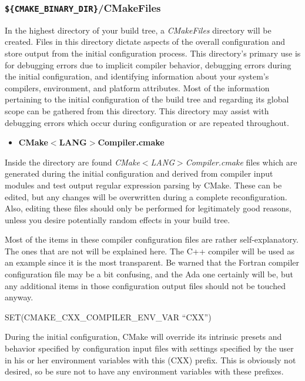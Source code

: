 \documentclass[12pt,letterpaper]{article}
\begin{document}
\subsubsection{\texttt{\$\{CMAKE\_BINARY\_DIR\}}/CMakeFiles}

In the highest directory of your build tree, a \emph{CMakeFiles} directory will be created.  Files in this directory dictate aspects of the overall configuration and store output from the initial configuration process.  This directory's primary use is for debugging errors due to implicit compiler behavior, debugging errors during the initial configuration, and identifying information about your system's compilers, environment, and platform attributes.  Most of the information pertaining to the initial configuration of the build tree and regarding its global scope can be gathered from this directory.  This directory may assist with debugging errors which occur during configuration or are repeated throughout.

\begin{itemize}
\item \textbf{CMake$<$LANG$>$Compiler.cmake}
\end{itemize}

Inside the directory are found \emph{CMake$<$LANG$>$Compiler.cmake} files which are generated during the initial configuration and derived from compiler input modules and test output regular expression parsing by CMake.  These can be edited, but any changes will be overwritten during a complete reconfiguration.  Also, editing these files should only be performed for legitimately good reasons, unless you desire potentially random effects in your build tree.

Most of the items in these compiler configuration files are rather self-explanatory.  The ones that are not will be explained here.  The C++ compiler will be used as an example since it is the most transparent.  Be warned that the Fortran compiler configuration file may be a bit confusing, and the Ada one certainly will be, but any additional items in those configuration output files should not be touched anyway.

\begin{shaded}
\noindent SET(CMAKE\_CXX\_COMPILER\_ENV\_VAR ``CXX'')
\end{shaded}

During the initial configuration, CMake will override its intrinsic presets and behavior specified by configuration input files with settings specified by the user in his or her environment variables with this (CXX) prefix.  This is obviously not desired, so be sure not to have any environment variables with these prefixes.
\end{document}
